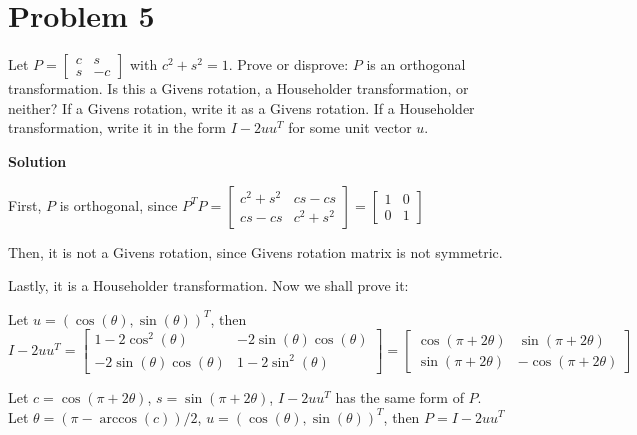 \documentclass[12pt,oneside,a4paper]{article}
\newcommand{\problem}[1]
{
    \clearpage
    \section*{Problem {#1}}
}
\newcommand{\solution}
{
    \vspace{15pt}
    \noindent\ignorespaces\textbf{\large Solution}\par
}
\begin{document}
\problem{5}
Let $P = \begin{bmatrix}
c & s\\
s & -c
\end{bmatrix}$ with $c^2 + s^2 = 1$. Prove or disprove: $P$ is an orthogonal transformation. Is this a Givens rotation, a Householder transformation, or neither? If a Givens rotation, write it as a Givens rotation. If a Householder transformation, write it in the form $I - 2uu^{T}$ for some unit vector $u$.

\solution
First, $P$ is orthogonal, since $P^{T}P = \begin{bmatrix}
c^2 + s^2 & cs - cs\\
cs - cs & c^2 + s^2
\end{bmatrix} = \begin{bmatrix}
1 & 0 \\
0 & 1
\end{bmatrix}$

Then, it is not a Givens rotation, since Givens rotation matrix is not symmetric.

Lastly, it is a Householder transformation. Now we shall prove it:

Let $u = (\cos(\theta), \sin(\theta))^{T}$, then 
$$I - 2 u u^{T} = \begin{bmatrix}
1 - 2\cos^2(\theta) & -2\sin(\theta)\cos(\theta)\\
-2\sin(\theta)\cos(\theta) & 1 - 2\sin^2(\theta)
\end{bmatrix} = \begin{bmatrix}
\cos(\pi + 2\theta) & \sin(\pi + 2\theta)\\
\sin(\pi + 2\theta) & -\cos(\pi + 2\theta)
\end{bmatrix}$$

Let $c = \cos(\pi + 2\theta)$, $s = \sin(\pi + 2\theta)$, $I - 2 u u^{T}$ has the same form of $P$.\\
Let $\theta = (\pi - \arccos(c)) / 2$, $u = (\cos(\theta), \sin(\theta))^{T}$, then $P = I-2uu^{T}$
\end{document}
